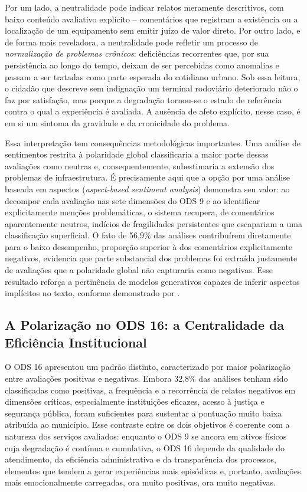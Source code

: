 Por um lado, a neutralidade pode indicar relatos meramente descritivos, com baixo conteúdo avaliativo explícito -- comentários que registram a existência ou a localização de um equipamento sem emitir juízo de valor direto. Por outro lado, e de forma mais reveladora, a neutralidade pode refletir um processo de \textit{normalização de problemas crônicos}: deficiências recorrentes que, por sua persistência ao longo do tempo, deixam de ser percebidas como anomalias e passam a ser tratadas como parte esperada do cotidiano urbano. Sob essa leitura, o cidadão que descreve sem indignação um terminal rodoviário deteriorado não o faz por satisfação, mas porque a degradação tornou-se o estado de referência contra o qual a experiência é avaliada. A ausência de afeto explícito, nesse caso, é em si um sintoma da gravidade e da cronicidade do problema.

Essa interpretação tem consequências metodológicas importantes. Uma análise de sentimentos restrita à polaridade global classificaria a maior parte dessas avaliações como neutras e, consequentemente, subestimaria a extensão dos problemas de infraestrutura. É precisamente aqui que a opção por uma análise baseada em aspectos (\textit{aspect-based sentiment analysis}) demonstra seu valor: ao decompor cada avaliação nas sete dimensões do ODS 9 e ao identificar explicitamente menções problemáticas, o sistema recupera, de comentários aparentemente neutros, indícios de fragilidades persistentes que escapariam a uma classificação superficial. O fato de 56,9\% das análises contribuírem diretamente para o baixo desempenho, proporção superior à dos comentários explicitamente negativos, evidencia que parte substancial dos problemas foi extraída justamente de avaliações que a polaridade global não capturaria como negativas. Esse resultado reforça a pertinência de modelos generativos capazes de inferir aspectos implícitos no texto, conforme demonstrado por \citeauthor{agua2025} \citeyear{agua2025}.

\subsection{A Polarização no ODS 16: a Centralidade da Eficiência Institucional}
\label{subsec:disc-ods16}

O ODS 16 apresentou um padrão distinto, caracterizado por maior polarização entre avaliações positivas e negativas. Embora 32,8\% das análises tenham sido classificadas como positivas, a frequência e a recorrência de relatos negativos em dimensões críticas, especialmente instituições eficazes, acesso à justiça e segurança pública, foram suficientes para sustentar a pontuação muito baixa atribuída ao município. Esse contraste entre os dois objetivos é coerente com a natureza dos serviços avaliados: enquanto o ODS 9 se ancora em ativos físicos cuja degradação é contínua e cumulativa, o ODS 16 depende da qualidade do atendimento, da eficiência administrativa e da transparência dos processos, elementos que tendem a gerar experiências mais episódicas e, portanto, avaliações mais emocionalmente carregadas, ora muito positivas, ora muito negativas.

